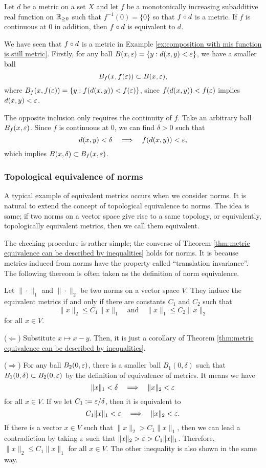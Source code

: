 \begin{thm}\label{thm:composition with continuous mis function is equivalent}
Let $d$ be a metric on a set $X$ and let $f$ be a monotonically increasing subadditive real function on $\mathbb{R}_{\ge0}$ such that $f^{-1}(0)=\{0\}$ so that $f\o d$ is a metric.
If $f$ is continuous at 0 in addition, then $f\o d$ is equivalent to $d$.
\end{thm}
\begin{pf}
We have seen that $f\o d$ is a metric in Example \ref{ex:composition with mis function is still metric}.
Firstly, for any ball $B(x,\varepsilon)=\{y:d(x,y)<\varepsilon\}$, we have a smaller ball
\[B_f(x,f(\varepsilon))\subset B(x,\varepsilon),\]
where $B_f(x,f(\varepsilon))=\{y:f(d(x,y))<f(\varepsilon)\}$, since $f(d(x,y))<f(\varepsilon)$ implies $d(x,y)<\varepsilon$.

The opposite inclusion only requires the continuity of $f$.
Take an arbitrary ball $B_f(x,\varepsilon)$.
Since $f$ is continuous at 0, we can find $\delta>0$ such that
\[d(x,y)<\delta\impl f(d(x,y))<\e,\]
which implies $B(x,\delta)\subset B_f(x,\varepsilon)$.
\end{pf}

\subsubsection{Topological equivalence of norms}

A typical example of equivalent metrics occurs when we consider norms.
It is natural to extend the concept of topological equivalence to norms.
The idea is same; if two norms on a vector space give rise to a same topology, or equivalently, topologically equivalent metrics, then we call them equivalent.

The checking procedure is rather simple; the converse of Theorem \ref{thm:metric equivalence can be described by inequalities} holds for norms.
It is because metrics induced from norms have the property called ``translation invariance''.
The following thereom is often taken as the definition of norm equivalence.

\begin{thm}
Let $\|\cdot\|_1$ and $\|\cdot\|_2$ be two norms on a vector space $V$.
They induce the equivalent metrics if and only if there are constants $C_1$ and $C_2$ such that
\[\|x\|_2\le C_1\|x\|_1\quad\text{and}\quad\|x\|_1\le C_2\|x\|_2\]
for all $x\in V$.
\end{thm}
\begin{pf}
($\Leftarrow$) Substitute $x\mapsto x-y$.
Then, it is just a corollary of Theorem \ref{thm:metric equivalence can be described by inequalities}.

($\Rightarrow$)
For any ball $B_2(0,\varepsilon)$, there is a smaller ball $B_1(0,\delta)$ such that $B_1(0,\delta)\subset B_2(0,\varepsilon)$ by the definition of equivalence of metrics.
It means we have
\[\|x\|_1<\delta\impl\|x\|_2<\e\]
for all $x\in V$.
If we let $C_1:=\varepsilon/\delta$, then it is equivalent to
\[C_1\|x\|_1<\e\impl\|x\|_2<\e.\]
If there is a vector $x\in V$ such that $\|x\|_2>C_1\|x\|_1$, then we can lead a contradiction by taking $\varepsilon$ such that $\|x\|_2>\varepsilon>C_1\|x\|_1$.
Therefore, $\|x\|_2\le C_1\|x\|_1$ for all $x\in V$.
The other inequality is also shown in the same way.
\end{pf}

